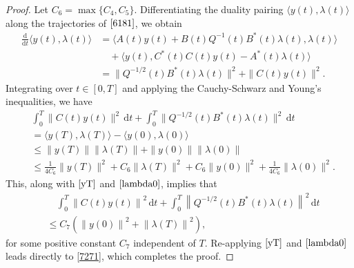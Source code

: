 \documentclass{IEEEtran}
\begin{document}
\begin{proof}
		Let $C_6=\max\{C_4,C_5\}$. 
		Differentiating the duality pairing $\langle y(t), \lambda(t)\rangle$ along the trajectories of $\eqref{6181}$, we obtain
		\begin{equation*}
			\begin{split}
				\frac{\mathrm{d}}{\mathrm{d}t}\langle y(t), \lambda(t)\rangle &= \langle A(t) y(t)+B(t)Q^{-1}(t)B^*(t)\lambda(t), \lambda(t)\rangle \\
				&\quad + \langle y(t), C^*(t)C(t)y(t)-A^*(t)\lambda(t)\rangle\\
				&= \|Q^{-1/2}(t)B^*(t)\lambda(t)\|^2 + \|C(t) y(t)\|^2.
			\end{split}
		\end{equation*}
		Integrating over $t \in [0,T]$ and applying the Cauchy-Schwarz and Young's inequalities, we have
		\begin{equation*}
			\begin{split}
				&\int_0^T \|C(t) y(t)\|^2\,\mathrm{d}t + \int_0^T \|Q^{-1/2}(t)B^*(t)\lambda(t)\|^2\,\mathrm{d}t \\&= \langle y(T),\lambda(T)\rangle - \langle y(0),\lambda(0)\rangle \\
				&\leq \|y(T)\| \|\lambda(T)\| + \|y(0)\| \|\lambda(0)\|\\
				&\leq \frac{1}{4C_6}\|y(T)\|^2 + C_6\|\lambda(T)\|^2 + C_6\|y(0)\|^2 + \frac{1}{4C_6}\|\lambda(0)\|^2.
			\end{split}
		\end{equation*}
		This, along with $\eqref{yT}$ and $\eqref{lambda0}$, implies that
		\begin{equation*}
			\begin{split}
				&\quad \int_0^T \left\| C(t) y(t)\right\|^2 \,\mathrm{d}t + \int_0^T\left\|Q^{-1/2}(t)B^*(t)\lambda(t) \right\|^2 \,\mathrm{d}t\\
				&\leqslant C_7\left( \left\|y(0) \right\|^2+\left\| \lambda(T) \right\|^2\right),
			\end{split}
		\end{equation*}
		for some positive constant $C_7$ independent of $T$. Re-applying $\eqref{yT}$ and $\eqref{lambda0}$ leads directly to \eqref{7271}, which completes the proof.
	\end{proof}
	
\end{document}
